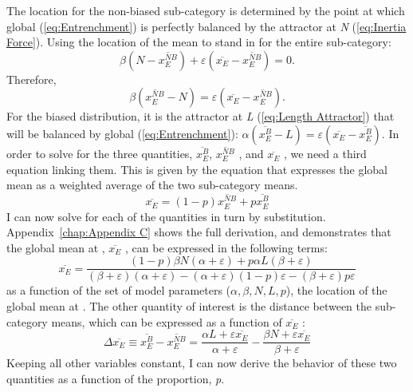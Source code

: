 The  location for the non-biased sub-category is determined
by the point at which global  (\ref{eq:Entrenchment})
is perfectly balanced by the attractor at \emph{N} (\ref{eq:Inertia Force}).
Using the  location of the mean to stand in for the entire
sub-category: \[\beta\left(N-\overline{x_{E}^{NB}}\right)+\varepsilon\left(\overline{x_{E}}-\overline{x_{E}^{NB}}\right)=0\text{.}\]
Therefore, \[\beta\left(\overline{x_{E}^{NB}}-N\right)=\varepsilon\left(\overline{x_{E}}-\overline{x_{E}^{NB}}\right)\text{.}\]
For the biased distribution, it is the attractor at \emph{L} (\ref{eq:Length Attractor})
that will be balanced by global  (\ref{eq:Entrenchment}):
$\alpha(\overline{x_{E}^{B}}-L)=\varepsilon(\overline{x_{E}}-\overline{x_{E}^{B}})$.
In order to solve for the three quantities, $\overline{x_{E}^{B}}$,
$\overline{x_{E}^{NB}}$ , and $\overline{x_{E}}$ , we need a third
equation linking them. This is given by the equation that expresses
the global mean as a weighted average of the two sub-category means.
\begin{equation}
\overline{x_{E}}=(1-p)\overline{x_{E}^{NB}}+p\overline{x_{E}^{B}}\label{eq:weighted mean}
\end{equation}
I can now solve for each of the quantities in turn by substitution.
Appendix~\ref{chap:Appendix C} shows the full derivation, and demonstrates that the global
mean at , $\overline{x_{E}}$ , can be expressed in the
following terms:
\begin{equation}
\overline{x_{E}}=\frac{(1-p)\beta N(\alpha+\varepsilon)+p\alpha L(\beta+\varepsilon)}{(\beta+\varepsilon)(\alpha+\varepsilon)-(\alpha+\varepsilon)(1-p)\varepsilon-(\beta+\varepsilon)p\varepsilon}\label{eq: sub-dist}
\end{equation}
as a function of the set of model parameters ($\alpha,\beta,N,L,p$),
the location of the global mean at . The other quantity
of interest is the distance between the sub-category means, which
can be expressed as a function of $\overline{x_{E}}$ :
\begin{equation}
\Delta\overline{x_{E}}\equiv\overline{x_{E}^{B}}-\overline{x_{E}^{NB}}=\frac{\alpha L+\varepsilon\overline{x_{E}}}{\alpha+\varepsilon}-\frac{\beta N+\varepsilon\overline{x_{E}}}{\beta+\varepsilon}\label{eq:State Model-sep}
\end{equation}
Keeping all other variables constant, I can now derive the behavior
of these two quantities as a function of the  proportion, \emph{p}. 

